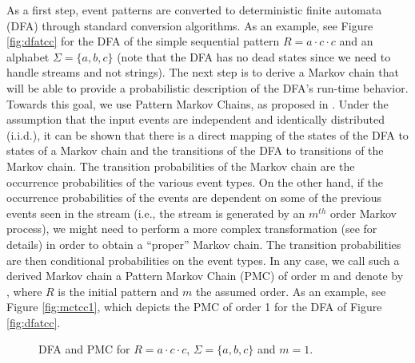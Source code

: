 As a first step, event patterns are converted to deterministic finite automata (DFA) through standard conversion algorithms.
As an example, see Figure \ref{fig:dfatcc} for the DFA of the simple sequential pattern $R=a\cdot c\cdot c$ and an alphabet $\Sigma=\{a,b,c\}$
(note that the DFA has no dead states since we need to handle streams and not strings).
The next step is to derive a Markov chain that will be able to provide a probabilistic description of the DFA's run-time behavior.
Towards this goal, we use Pattern Markov Chains, as  proposed in \cite{nuel_pattern_2008}.
Under the assumption that the input events are independent and identically distributed (i.i.d.), it can be shown that there is a direct mapping of the states of the DFA to states of a Markov chain and the transitions of the DFA to transitions of the Markov chain.
The transition probabilities of the Markov chain are the occurrence probabilities of the various event types.
On the other hand, if the occurrence probabilities of the events are dependent on some of the previous events seen in the stream 
(i.e., the stream is generated by an $m^{th}$ order Markov process),
we might need to perform a more complex transformation 
(see \cite{nuel_pattern_2008} for details)
in order to obtain a ``proper'' Markov chain.
The transition probabilities are then conditional probabilities on the event types.
In any case,
we call such a derived Markov chain a Pattern Markov Chain (PMC) of order m
and denote by \pmcmr , where $R$ is the initial pattern and $m$ the assumed order.
As an example, see Figure \ref{fig:mctcc1}, which depicts the PMC of order 1 for the DFA of Figure \ref{fig:dfatcc}.
\begin{figure}[!ht]
\begin{centering}
\hfill
{}
\caption{DFA and PMC for $R=a\cdot c\cdot c$,  $\Sigma=\{a,b,c\}$ and $m=1$.}
\label{fig:dfa_mc_example}
\end{centering}
\end{figure}


